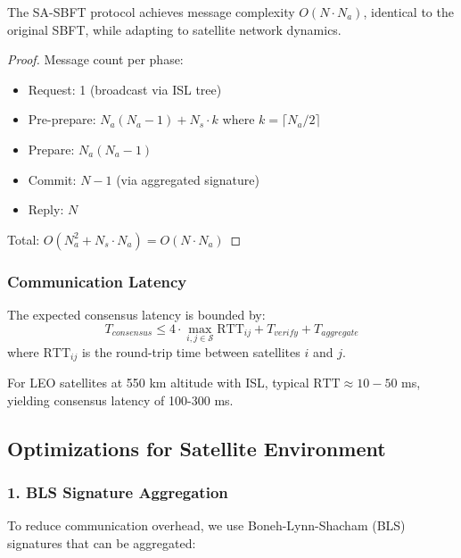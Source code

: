 \begin{theorem}
The SA-SBFT protocol achieves message complexity $O(N \cdot N_a)$, identical to the original SBFT, while adapting to satellite network dynamics.
\end{theorem}

\begin{proof}
Message count per phase:
\begin{itemize}
    \item Request: 1 (broadcast via ISL tree)
    \item Pre-prepare: $N_a(N_a-1) + N_s \cdot k$ where $k = \lceil N_a/2 \rceil$
    \item Prepare: $N_a(N_a-1)$
    \item Commit: $N-1$ (via aggregated signature)
    \item Reply: $N$
\end{itemize}
Total: $O(N_a^2 + N_s \cdot N_a) = O(N \cdot N_a)$
\end{proof}

\subsubsection{Communication Latency}

\begin{theorem}
The expected consensus latency is bounded by:
\begin{equation}
T_{consensus} \leq 4 \cdot \max_{i,j \in \mathcal{S}} \text{RTT}_{ij} + T_{verify} + T_{aggregate}
\end{equation}
where $\text{RTT}_{ij}$ is the round-trip time between satellites $i$ and $j$.
\end{theorem}

For LEO satellites at 550 km altitude with ISL, typical $\text{RTT} \approx 10-50$ ms, yielding consensus latency of 100-300 ms.

\subsection{Optimizations for Satellite Environment}

\subsubsection{1. BLS Signature Aggregation}

To reduce communication overhead, we use Boneh-Lynn-Shacham (BLS) signatures that can be aggregated:


